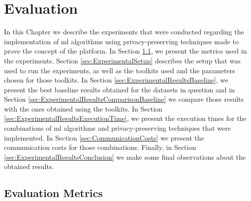 %

\acresetall

\chapter{Evaluation}
\label{ch:Evaluation}

In this Chapter we describe the experiments that were conducted regarding the implementation of \ac{ml} algorithms using privacy-preserving techniques made to prove the concept of the platform. In Section \ref{sec:EvaluationMetrics}, we present the metrics used in the experiments. Section \ref{sec:ExperimentalSetup} describes the setup that was used to run the experiments, as well as the toolkits used and the parameters chosen for those toolkits. In Section \ref{sec:ExperimentalResultsBaseline}, we present the best baseline results obtained for the datasets in question and in Section \ref{sec:ExperimentalResultsComparisonBaseline} we compare those results with the ones obtained using the toolkits. In Section \ref{sec:ExperimentalResultsExecutionTime}, we present the execution times for the combinations of \ac{ml} algorithms and privacy-preserving techniques that were implemented. In Section \ref{sec:CommunicationCosts} we present the communication costs for those combinations. Finally, in Section \ref{sec:ExperimentalResultsConclusion} we make some final observations about the obtained results.



\section{Evaluation Metrics}
\label{sec:EvaluationMetrics}

